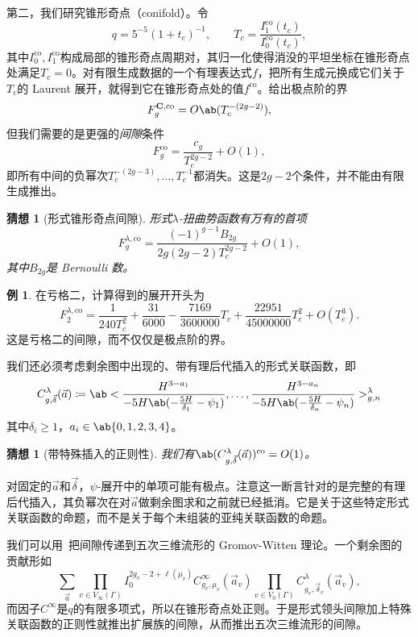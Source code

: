 \documentclass{amsart}
\newtheorem{conj}[thm]{猜想}
\theoremstyle{definition}
\newtheorem{exm}[thm]{例}
\theoremstyle{remark}
\theoremstyle{plain}
\theoremstyle{definition}
\theoremstyle{remark}
\newcommand{\mbf}[1]{\mathbf{#1}}
\newcommand{\mr}[1]{\mathrm{#1}}
\newcommand{\1}{\mathbf{1}}
\newcommand{\2}{\mathbf{2}}
\newcommand{\3}{\mathbf{3}}
\begin{document}
第二，我们研究锥形奇点（conifold）。令
\[ q = 5^{-5}(1+t_c)^{-1}, \qquad T_c = \frac{I_1^{\mr{co}}(t_c)}{I_0^{\mr{co}}(t_c)}, \]
其中\(I_0^{\mr{co}}, I_1^{\mr{co}}\)构成局部的锥形奇点周期对，其归一化使得消没的平坦坐标在锥形奇点处满足\(T_c = 0\)。对有限生成数据的一个有理表达式\(f\)，把所有生成元换成它们关于\(T_c\)的 Laurent 展开，就得到它在锥形奇点处的值\(f^{\mr{co}}\)。给出极点阶的界
\[ F_g^{\mbf{C},\mr{co}} = O\ab(T_c^{-(2g-2)}), \]
但我们需要的是更强的\textit{间隙}条件
\[ F_g^{\mr{co}} = \frac{c_g}{T_c^{2g-2}} + O(1), \]
即所有中间的负幂次\(T_c^{-(2g-3)}, \ldots, T_c^{-1}\)都消失。这是\(2g-2\)个条件，并不能由有限生成推出。

\begin{conj}[形式锥形奇点间隙]%
\label{conj:formal conifold gap}
    形式\(\lambda\)-扭曲势函数有万有的首项
    \[ F_g^{\lambda,\mr{co}} = \frac{(-1)^{g-1}B_{2g}}{2g(2g-2)T_c^{2g-2}} + O(1), \]
    其中\(B_{2g}\)是 Bernoulli 数。
\end{conj}

\begin{exm}
    在亏格二，计算得到的展开开头为
    \[ F_2^{\lambda,\mr{co}} = \frac{1}{240T_c^2} + \frac{31}{6000} - \frac{7169}{3600000}T_c + \frac{22951}{45000000}T_c^2 + O(T_c^3). \]
    这是亏格二的间隙，而不仅仅是极点阶的界。
\end{exm}

我们还必须考虑剩余图中出现的、带有理后代插入的形式关联函数，即
\[ C^{\lambda}_{g,\vec{\delta}}(\vec{a}) \coloneqq \ab< \frac{H^{3-a_1}}{-5H\ab(-\frac{5H}{\delta_1}-\psi_1)}, \ldots, \frac{H^{3-a_n}}{-5H\ab(-\frac{5H}{\delta_n}-\psi_n)}>^{\lambda}_{g,n} \]
其中\(\delta_i \geq 1\)，\(a_i \in \ab\{0,1,2,3,4\}\)。

\begin{conj}[带特殊插入的正则性]%
\label{conj:special correlator regularity}
    我们有\(\ab(C^{\lambda}_{g,\vec{\delta}}(\vec{a}))^{\mr{co}} = O(1)\)。
\end{conj}

对固定的\(\vec{a}\)和\(\vec{\delta}\)，\(\psi\)-展开中的单项可能有极点。注意这一断言针对的是完整的有理后代插入，其负幂次在对\(\vec{a}\)做剩余图求和之前就已经抵消。它是关于这些特定形式关联函数的命题，而不是关于每个未组装的亚纯关联函数的命题。

我们可以用~把间隙传递到五次三维流形的 Gromov-Witten 理论。一个剩余图的贡献形如
\[ \sum_{\vec{a}} \prod_{v \in V_{\infty}(\Gamma)}I_0^{2g_v-2+\ell(\mu_v)}C^{\infty}_{g_v,\mu_v}(\vec{a}_v)\prod_{v\in V_0(\Gamma)}C^{\lambda}_{g_v,\vec{\delta}_v}(\vec{a}_v), \]
而因子\(C^{\infty}\)是\(q\)的有限多项式，所以在锥形奇点处正则。于是形式领头间隙加上特殊关联函数的正则性就推出扩展族的间隙，从而推出五次三维流形的间隙。
\end{document}
